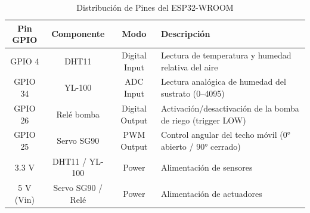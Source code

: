 \begin{table}[tp]
\centering
\renewcommand{\arraystretch}{1.3}
\caption{Distribución de Pines del ESP32-WROOM}
\label{tab:pines_esp32}
\begin{tabularx}{\textwidth}{|c|c|c|X|}
\hline
\textbf{Pin GPIO} & \textbf{Componente} & \textbf{Modo} & \textbf{Descripción} \\
\hline
GPIO 4 & DHT11 & Digital Input & Lectura de temperatura y humedad relativa del aire \\
\hline
GPIO 34 & YL-100 & ADC Input & Lectura analógica de humedad del sustrato (0--4095) \\
\hline
GPIO 26 & Relé bomba & Digital Output & Activación/desactivación de la bomba de riego (trigger LOW) \\
\hline
GPIO 25 & Servo SG90 & PWM Output & Control angular del techo móvil (0° abierto / 90° cerrado) \\
\hline
3.3 V & DHT11 / YL-100 & Power & Alimentación de sensores \\
\hline
5 V (Vin) & Servo SG90 / Relé & Power & Alimentación de actuadores \\
\hline
\end{tabularx}
\end{table}